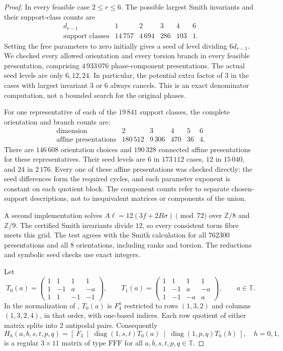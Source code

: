 \documentclass[11pt,a4paper]{article}
\theoremstyle{plain}
\theoremstyle{definition}
\theoremstyle{plain}
\begin{document}
\begin{proof}
In every feasible case $2\leq r\leq6$. The possible largest Smith invariants and their support-class counts are
$$\begin{array}{c|rrrrr}
d_{r-1}&1&2&3&4&6\\ \hline
\text{support classes}&14\,757&4\,694&286&103&1.
\end{array}$$
Setting the free parameters to zero initially gives a seed of level dividing $6d_{r-1}$. We checked every allowed orientation and every torsion branch in every feasible presentation, comprising $4\,933\,076$ phase-component presentations. The actual seed levels are only $6,12,24$. In particular, the potential extra factor of 3 in the cases with largest invariant $3$ or $6$ always cancels. This is an exact denominator computation, not a bounded search for the original phases.

For one representative of each of the $19\,841$ support classes, the complete orientation and branch counts are:
$$\begin{array}{c|rrrrr}
\text{dimension}&2&3&4&5&6\\ \hline
\text{affine presentations}&180\,512&9\,306&470&36&4.
\end{array}$$
There are $146\,608$ orientation choices and $190\,328$ connected affine presentations for these representatives. Their seed levels are $6$ in $173\,112$ cases, $12$ in $15\,040$, and $24$ in $2\,176$. Every one of these affine presentations was checked directly: the seed differences form the required cycles, and each parameter exponent is constant on each quotient block. The component counts refer to separate chosen-support descriptions, not to inequivalent matrices or components of the union.

\medskip

A second implementation solves $A\ell=12(3f+2B\sigma)\pmod{72}$ over $\mathbb Z/8$ and $\mathbb Z/9$. The certified Smith invariants divide $12$, so every consistent torus fibre meets this grid. The test agrees with the Smith calculation for all $762300$ presentations and all $8$ orientations, including ranks and torsion. The reductions and symbolic seed checks use exact integers.

\medskip
Let
$$T_0(a)=
\begin{pmatrix}
1&1&1&1\\
1&-1&a&-a\\
1&1&-1&-1
\end{pmatrix},
\qquad T_1(a)=
\begin{pmatrix}
1&1&1&1\\
1&-1&a&-a\\
1&-1&-a&a
\end{pmatrix},\qquad a\in\mathbb{T}.$$
In the normalization of \cite{regular78}, $T_0(a)$ is $F_4^a$ restricted to rows $(1,3,2)$ and columns $(1,3,2,4)$, in that order, with one-based indices. Each row quotient of either matrix splits into 2 antipodal pairs. Consequently
\[
H_h(a,b,s,t,p,q)= \left[\ F_3\ \middle|\ \operatorname{diag}(1,s,t)T_0(a)\ \middle|\ \operatorname{diag}(1,p,q)T_h(b)\ \right], \quad h=0,1,
\]
is a regular $3\times11$ matrix of type $\mathrm{FFF}$ for all $a,b,s,t,p,q\in\mathbb T$.


\end{proof}
\end{document}
